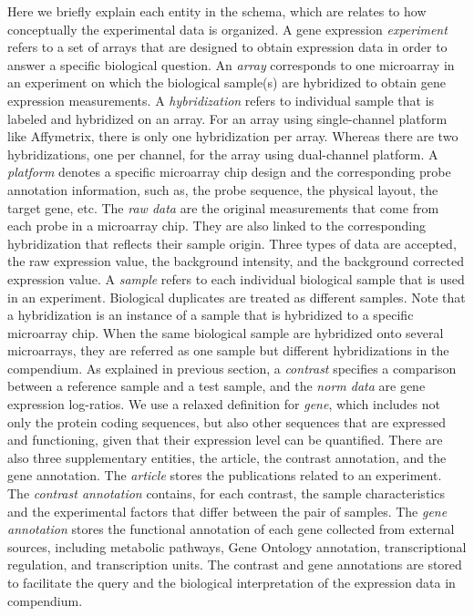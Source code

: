 Here we briefly explain each entity in the schema, which are relates to how conceptually the experimental data is organized. A gene expression \textit{experiment} refers to a set of arrays that are designed to obtain expression data in order to answer a specific biological question. An \textit{array} corresponds to one microarray in an experiment on which the biological sample(s) are hybridized to obtain gene expression measurements. A \textit{hybridization} refers to individual sample that is labeled and hybridized on an array. For an array using single-channel platform like Affymetrix, there is only one hybridization per array.  Whereas there are two hybridizations, one per channel, for the array using dual-channel platform. A \textit{platform} denotes a specific microarray chip design and the corresponding probe annotation information, such as, the probe sequence, the physical layout, the target gene, etc. The \textit{raw data} are the original measurements that come from each probe in a microarray chip.  They are also linked to the corresponding hybridization that reflects their sample origin. Three types of data are accepted, the raw expression value, the background intensity, and the background corrected expression value. A \textit{sample} refers to each individual biological sample that is used in an experiment.  Biological duplicates are treated as different samples. Note that a hybridization is an instance of a sample that is hybridized to a specific microarray chip.  When the same biological sample are hybridized onto several microarrays, they are referred as one sample but different hybridizations in the compendium. As explained in previous section, a \textit{contrast} specifies a comparison between a reference sample and a test sample, and the \textit{norm data} are gene expression log-ratios. We use a relaxed definition for \textit{gene}, which includes not only the protein coding sequences, but also other sequences that are expressed and functioning, given that their expression level can be quantified. There are also three supplementary entities, the article, the contrast annotation, and the gene annotation. The \textit{article} stores the publications related to an experiment. The \textit{contrast annotation} contains, for each contrast, the sample characteristics and the experimental factors that differ between the pair of samples. The \textit{gene annotation} stores the functional annotation of each gene collected from external sources, including metabolic pathways, Gene Ontology annotation, transcriptional regulation, and transcription units. The contrast and gene annotations are stored to facilitate the query and the biological interpretation of the expression data in compendium.

